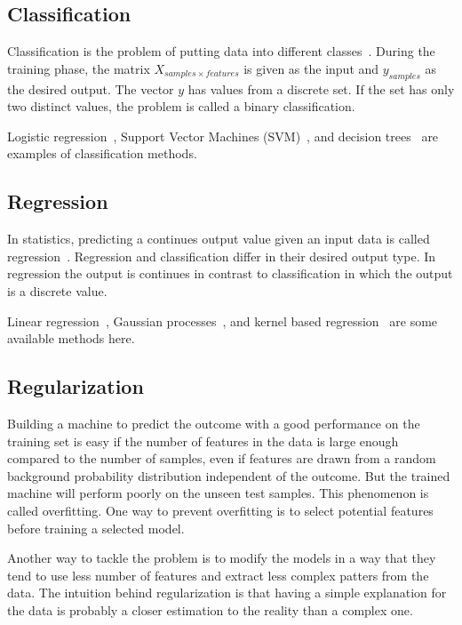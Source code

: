\subsection{Classification}
Classification is the problem of putting data into different classes~\cite{statistical-learning}. During the training phase, the matrix $X_{samples \times features}$ is given as the input and $y_{samples}$ as the desired output. The vector $y$ has values from a discrete set. If the set has only two distinct values, the problem is called a binary classification.

Logistic regression~\cite{logistic-regression1,logistic-regression2}, Support Vector Machines (SVM)~\cite{svm1,svm2}, and decision trees~\cite{decision-trees} are examples of classification methods.

\subsection{Regression}
In statistics, predicting a continues output value given an input data is called regression~\cite{regression}. Regression and classification differ in their desired output type. In regression the output is continues in contrast to classification in which the output is a discrete value.

Linear regression~\cite{statistical-learning}, Gaussian processes~\cite{gaussian-processes}, and kernel based regression~\cite{kernel-based-regression} are some available methods here.

\subsection{Regularization}
Building a machine to predict the outcome with a good performance on the training set is easy if the number of features in the data is large enough compared to the number of samples, even if features are drawn from a random background probability distribution independent of the outcome. But the trained machine will perform poorly on the unseen test samples. This phenomenon is called overfitting. One way to prevent overfitting is to select potential features before training a selected model.

Another way to tackle the problem is to modify the models in a way that they tend to use less number of features and extract less complex patters from the data. The intuition behind regularization is that having a simple explanation for the data is probably a closer estimation to the reality than a complex one.


